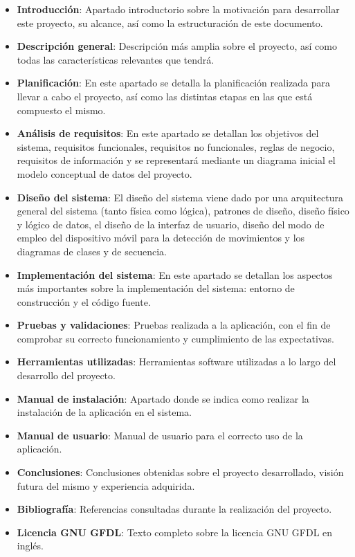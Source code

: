 \begin{itemize}
\item \textbf{Introducción}: Apartado introductorio sobre la motivación para desarrollar este proyecto, su alcance, así como la estructuración de este documento.
\item \textbf{Descripción general}: Descripción más amplia sobre el proyecto, así como todas las características relevantes que tendrá.
\item \textbf{Planificación}: En este apartado se detalla la planificación realizada para llevar a cabo el proyecto, así como las distintas etapas en las que está compuesto el mismo.
\item \textbf{Análisis de requisitos}: En este apartado se detallan los objetivos del sistema, requisitos funcionales, requisitos no funcionales, reglas de negocio, requisitos de información y se representará mediante un diagrama inicial el modelo conceptual de datos del proyecto.
\item \textbf{Diseño del sistema}: El diseño del sistema viene dado por una arquitectura general del sistema (tanto física como lógica), patrones de diseño, diseño físico y lógico de datos, el diseño de la interfaz de usuario, diseño del modo de empleo del dispositivo móvil para la detección de movimientos y los diagramas de clases y de secuencia.
\item \textbf{Implementación del sistema}: En este apartado se detallan los aspectos más importantes sobre la implementación del sistema: entorno de construcción y el código fuente.
\item \textbf{Pruebas y validaciones}: Pruebas realizada a la aplicación, con el fin de comprobar su correcto funcionamiento y cumplimiento de las expectativas.
\item \textbf{Herramientas utilizadas}: Herramientas software utilizadas a lo largo del desarrollo del proyecto.
\item \textbf{Manual de instalación}: Apartado donde se indica como realizar la instalación de la aplicación en el sistema.
\item \textbf{Manual de usuario}: Manual de usuario para el correcto uso de la aplicación.
\item \textbf{Conclusiones}: Conclusiones obtenidas sobre el proyecto desarrollado, visión futura del mismo y experiencia adquirida.
\item \textbf{Bibliografía}: Referencias consultadas durante la realización del proyecto.
\item \textbf{Licencia GNU GFDL}: Texto completo sobre la licencia GNU GFDL en inglés.
\end{itemize}

